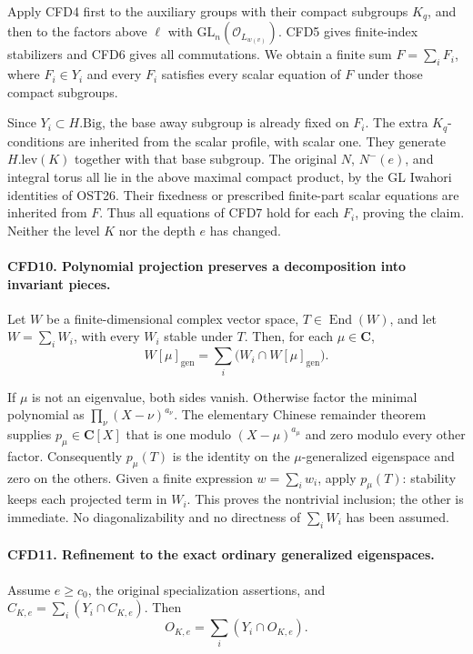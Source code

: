 Apply CFD4 first to the auxiliary groups with their compact subgroups
\(K_q\), and then to the factors above \(\ell\) with
\(\mathrm{GL}_n(\mathcal O_{L_{w(v)}})\).  CFD5 gives finite-index
stabilizers and CFD6 gives all commutations.  We obtain a finite sum
\(F=\sum_iF_i\), where \(F_i\in Y_i\) and every \(F_i\) satisfies
every scalar equation of \(F\) under those compact subgroups.

Since \(Y_i\subset H.\mathrm{Big}\), the base away subgroup is already
fixed on \(F_i\).  The extra \(K_q\)-conditions are inherited from
the scalar profile, with scalar one.  They generate
\(H.\mathrm{lev}(K)\) together with that base subgroup.  The original
\(N\), \(N^-(e)\), and integral torus all lie in the above maximal
compact product, by the GL Iwahori identities of OST26.  Their fixedness
or prescribed finite-part scalar equations are inherited from \(F\).
Thus all equations of CFD7 hold for each \(F_i\), proving the claim.
Neither the level \(K\) nor the depth \(e\) has changed.

\paragraph{CFD10. Polynomial projection preserves a decomposition into invariant pieces.}
\label{claim:CFD10}
Let \(W\) be a finite-dimensional complex vector space, \(T\in
\operatorname{End}(W)\), and let \(W=\sum_iW_i\), with every
\(W_i\) stable under \(T\).  Then, for each \(\mu\in\mathbf C\),
\[
 W[\mu]_{\mathrm{gen}}
       =\sum_i\bigl(W_i\cap W[\mu]_{\mathrm{gen}}\bigr).
\]

If \(\mu\) is not an eigenvalue, both sides vanish.  Otherwise factor
the minimal polynomial as \(\prod_\nu(X-\nu)^{a_\nu}\).  The elementary
Chinese remainder theorem supplies \(p_\mu\in\mathbf C[X]\) that is one
modulo \((X-\mu)^{a_\mu}\) and zero modulo every other factor.
Consequently \(p_\mu(T)\) is the identity on the \(\mu\)-generalized
eigenspace and zero on the others.  Given a finite expression
\(w=\sum_iw_i\), apply \(p_\mu(T)\): stability keeps each projected
term in \(W_i\).  This proves the nontrivial inclusion; the other is
immediate.  No diagonalizability and no directness of \(\sum_iW_i\)
has been assumed.

\paragraph{CFD11. Refinement to the exact ordinary generalized eigenspaces.}
\label{claim:CFD11}
Assume \(e\ge c_0\), the original specialization assertions, and
\(C_{K,e}=\sum_i(Y_i\cap C_{K,e})\).  Then
\[
                         O_{K,e}=\sum_i(Y_i\cap O_{K,e}).
\]

